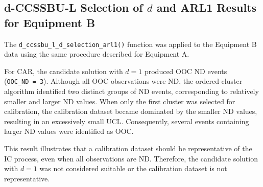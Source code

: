 \documentclass[
  12pt,
  letterpaper,
  DIV=11,
  numbers=noendperiod]{scrartcl}
\begin{document}
\FloatBarrier

\subsection{\texorpdfstring{d-CCSSBU-L Selection of \(d\) and ARL1
Results for Equipment
B}{d-CCSSBU-L Selection of d and ARL1 Results for Equipment B}}\label{d-ccssbu-l-selection-of-d-and-arl1-results-for-equipment-b}

The \texttt{d\_ccssbu\_l\_d\_selection\_arl1()} function was applied to
the Equipment B data using the same procedure described for Equipment A.

For CAR, the candidate solution with \(d=1\) produced OOC ND events
(\texttt{OOC\_ND\ =\ 3}). Although all OOC observations were ND, the
ordered-cluster algorithm identified two distinct groups of ND events,
corresponding to relatively smaller and larger ND values. When only the
first cluster was selected for calibration, the calibration dataset
became dominated by the smaller ND values, resulting in an excessively
small UCL. Consequently, several events containing larger ND values were
identified as OOC.

This result illustrates that a calibration dataset should be
representative of the IC process, even when all observations are ND.
Therefore, the candidate solution with \(d=1\) was not considered
suitable or the calibration dataset is not representative.
\end{document}
